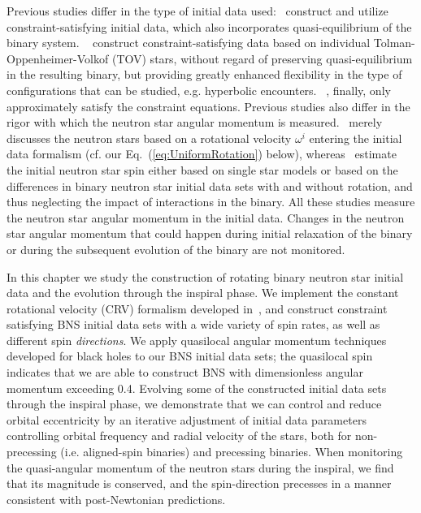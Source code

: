 Previous studies differ in the type of initial data used:~\citep{Baumgarte:2009fw,Tichy:2011gw,Tichy:2012rp,Bernuzzi:2013rza}
construct and utilize constraint-satisfying initial data, which also
incorporates quasi-equilibrium of the binary system.
~\cite{East:2012zn,East:2015yea} construct constraint-satisfying
data based on individual Tolman-Oppenheimer-Volkof (TOV) stars, without regard of preserving
quasi-equilibrium in the resulting binary, but providing greatly
enhanced flexibility in the type of configurations that can be
studied, e.g. hyperbolic encounters.
~\cite{Kastaun:2013mv,Tsatsin:2013jca}, finally, only
approximately satisfy the constraint equations.
Previous studies also
differ in the rigor with which the neutron star angular momentum is
measured.~\cite{Tichy:2012rp} merely discusses the neutron stars
based on a rotational velocity $\omega^i$ entering the initial data
formalism (cf. our Eq.~(\ref{eq:UniformRotation}) below), whereas~\citep{Bernuzzi:2013rza,Kastaun:2013mv,East:2015yea} estimate the
initial neutron star spin either based on single star models or based
on the differences in binary neutron star initial data sets with and
without rotation, and thus neglecting the impact of interactions in
the binary. All these studies measure the neutron star angular
momentum in the initial data. Changes in the neutron star angular
momentum that could happen during initial
relaxation of the binary or during the subsequent evolution of the
binary are not monitored.

In this chapter we study the construction of rotating binary neutron
star initial data and the evolution through the inspiral phase. We
implement the constant rotational velocity (CRV) formalism developed
in~\cite{Tichy:2012rp}, and construct constraint satisfying BNS
initial data sets with a wide variety of spin rates, as well as different spin
{\it directions}. We apply quasilocal angular momentum techniques
developed for black holes to our BNS initial data sets; the
quasilocal spin indicates that we are able to construct BNS with
dimensionless angular momentum exceeding 0.4. Evolving some of the
constructed initial data sets through the inspiral phase, we
demonstrate that we can control and reduce orbital eccentricity by an
iterative adjustment of initial data parameters controlling orbital
frequency and radial velocity of the stars, both for non-precessing
(i.e. aligned-spin binaries) and precessing binaries. When monitoring
the quasi-angular momentum of the neutron stars during the inspiral,
we find that its magnitude is conserved, and the spin-direction
precesses in a manner consistent with post-Newtonian predictions.


